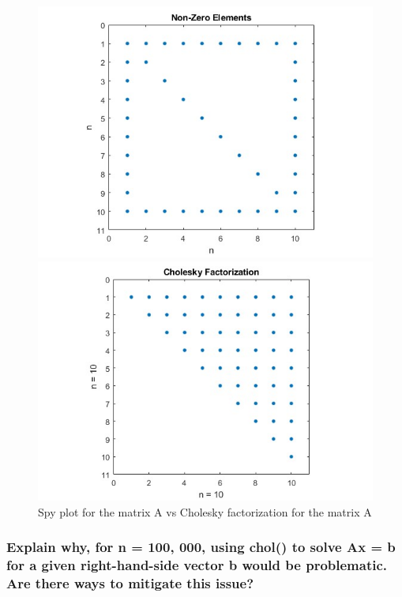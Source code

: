 \documentclass[unicode,11pt,a4paper,oneside,numbers=endperiod,openany]{scrartcl}
\begin{document}
\begin{figure}[H]
    \centering
    \begin{minipage}[b]{0.45\textwidth}
        \centering
        \includegraphics[width=\textwidth]{images/nbyn.jpg}
    \end{minipage}
    \hfill
    \begin{minipage}[b]{0.45\textwidth}
        \centering
        \includegraphics[width=\textwidth]{images/chol.jpg}
    \end{minipage}
    \caption{Spy plot for the matrix A vs Cholesky factorization for the matrix A}
    \label{fig:comparison}
\end{figure}

\subsubsection{Explain why, for n = 100, 000, using chol() to solve Ax = b for a given right-hand-side vector b would be problematic. Are there ways to mitigate this issue?}
\end{document}
